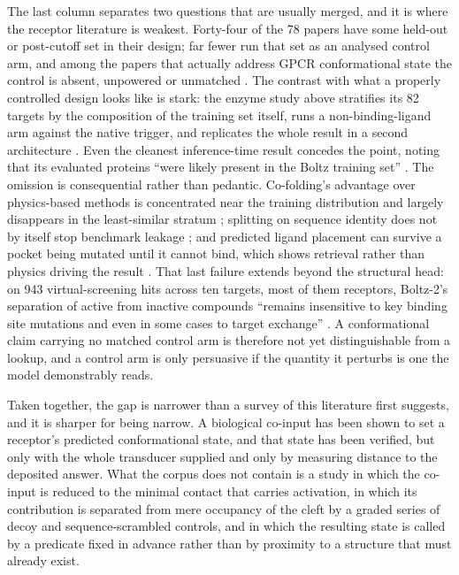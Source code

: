 The last column separates two questions that are usually merged, and it is where the receptor
literature is weakest. Forty-four of the 78 papers have some held-out or post-cutoff set in their
design; far fewer run that set as an analysed control arm, and among the papers that actually
address GPCR conformational state the control is absent, unpowered or unmatched
\citep{chib2025gpcrstates,ye2026multistatebias,obendorf2026statespecific,yang2025statespecific}. The
contrast with what a properly controlled design looks like is stark: the enzyme study above
stratifies its 82 targets by the composition of the training set itself, runs a non-binding-ligand
arm against the native trigger, and replicates the whole result in a second architecture
\citep[Results]{yu2026domainmotion}. Even
the cleanest inference-time result concedes the point, noting that its evaluated proteins ``were
likely present in the Boltz training set'' \citep[p.~6]{richman2025conformix}. The omission is consequential
rather than pedantic. Co-folding's advantage over physics-based methods is concentrated near the
training distribution and largely disappears in the least-similar stratum
\citep{skrinjar2026generalization,roehrig2026docking}; splitting on sequence identity does not by itself
stop benchmark leakage \citep{mattsson2026leakage}; and predicted ligand placement can survive a pocket
being mutated until it cannot bind, which shows retrieval rather than physics driving the result
\citep{masters2025physics}. That last failure extends beyond the structural head: on 943
virtual-screening hits across ten targets, most of them receptors, Boltz-2's separation of active from
inactive compounds ``remains insensitive to key binding site mutations and even in some cases to
target exchange'' \citep[Abstract]{bret2025boltz2docking}. A conformational claim carrying no matched
control arm is therefore not yet distinguishable from a lookup, and a control arm is only
persuasive if the quantity it perturbs is one the model demonstrably reads.

Taken together, the gap is narrower than a survey of this literature first suggests, and it is
sharper for being narrow. A biological co-input has been shown to set a receptor's predicted
conformational state, and that state has been verified, but only with the whole transducer
supplied and only by measuring distance to the deposited answer. What the corpus does not contain
is a study in which the co-input is reduced to the minimal contact that carries activation, in
which its contribution is separated from mere occupancy of the cleft by a graded series of decoy
and sequence-scrambled controls, and in which the resulting state is called by a predicate fixed
in advance rather than by proximity to a structure that must already exist.

